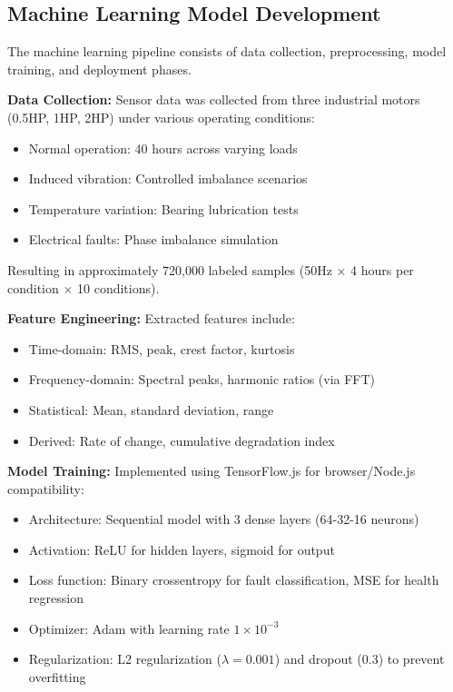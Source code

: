 \documentclass[conference]{IEEEtran}
\begin{document}
\subsection{Machine Learning Model Development}

The machine learning pipeline consists of data collection, preprocessing, model training, and deployment phases.

\textbf{Data Collection:} Sensor data was collected from three industrial motors (0.5HP, 1HP, 2HP) under various operating conditions:
\begin{itemize}
\item Normal operation: 40 hours across varying loads
\item Induced vibration: Controlled imbalance scenarios
\item Temperature variation: Bearing lubrication tests
\item Electrical faults: Phase imbalance simulation
\end{itemize}

Resulting in approximately 720,000 labeled samples (50Hz × 4 hours per condition × 10 conditions).

\textbf{Feature Engineering:} Extracted features include:
\begin{itemize}
\item Time-domain: RMS, peak, crest factor, kurtosis
\item Frequency-domain: Spectral peaks, harmonic ratios (via FFT)
\item Statistical: Mean, standard deviation, range
\item Derived: Rate of change, cumulative degradation index
\end{itemize}

\textbf{Model Training:} Implemented using TensorFlow.js for browser/Node.js compatibility:
\begin{itemize}
\item Architecture: Sequential model with 3 dense layers (64-32-16 neurons)
\item Activation: ReLU for hidden layers, sigmoid for output
\item Loss function: Binary crossentropy for fault classification, MSE for health regression
\item Optimizer: Adam with learning rate $1 \times 10^{-3}$
\item Regularization: L2 regularization ($\lambda = 0.001$) and dropout (0.3) to prevent overfitting
\end{itemize}
\end{document}
